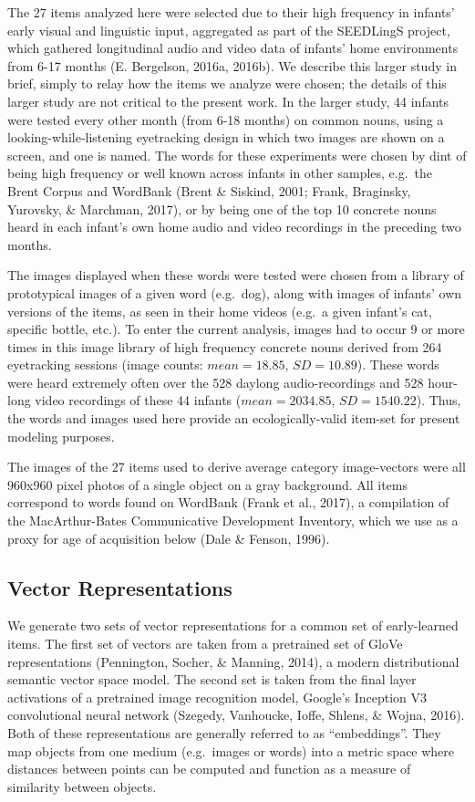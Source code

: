 \documentclass[10pt, letterpaper]{article}
\begin{document}
The 27 items analyzed here were selected due to their high frequency in
infants' early visual and linguistic input, aggregated as part of the
SEEDLingS project, which gathered longitudinal audio and video data of
infants' home environments from 6-17 months (E. Bergelson, 2016a,
2016b). We describe this larger study in brief, simply to relay how the
items we analyze were chosen; the details of this larger study are not
critical to the present work. In the larger study, 44 infants were
tested every other month (from 6-18 months) on common nouns, using a
looking-while-listening eyetracking design in which two images are shown
on a screen, and one is named. The words for these experiments were
chosen by dint of being high frequency or well known across infants in
other samples, e.g.~the Brent Corpus and WordBank (Brent \& Siskind,
2001; Frank, Braginsky, Yurovsky, \& Marchman, 2017), or by being one of
the top 10 concrete nouns heard in each infant's own home audio and
video recordings in the preceding two months.

The images displayed when these words were tested were chosen from a
library of prototypical images of a given word (e.g.~dog), along with
images of infants' own versions of the items, as seen in their home
videos (e.g.~a given infant's cat, specific bottle, etc.). To enter the
current analysis, images had to occur 9 or more times in this image
library of high frequency concrete nouns derived from 264 eyetracking
sessions (image counts: \(mean=18.85\), \(SD=10.89\)). These words were
heard extremely often over the 528 daylong audio-recordings and 528
hour-long video recordings of these 44 infants (\(mean=2034.85\),
\(SD=1540.22\)). Thus, the words and images used here provide an
ecologically-valid item-set for present modeling purposes.

The images of the 27 items used to derive average category image-vectors
were all 960x960 pixel photos of a single object on a gray background.
All items correspond to words found on WordBank (Frank et al., 2017), a
compilation of the MacArthur-Bates Communicative Development Inventory,
which we use as a proxy for age of acquisition below (Dale \& Fenson,
1996).

\subsection{Vector Representations}\label{vector-representations}

We generate two sets of vector representations for a common set of
early-learned items. The first set of vectors are taken from a
pretrained set of GloVe representations (Pennington, Socher, \& Manning,
2014), a modern distributional semantic vector space model. The second
set is taken from the final layer activations of a pretrained image
recognition model, Google's Inception V3 convolutional neural network
(Szegedy, Vanhoucke, Ioffe, Shlens, \& Wojna, 2016). Both of these
representations are generally referred to as ``embeddings''. They map
objects from one medium (e.g.~images or words) into a metric space where
distances between points can be computed and function as a measure of
similarity between objects.
\end{document}
